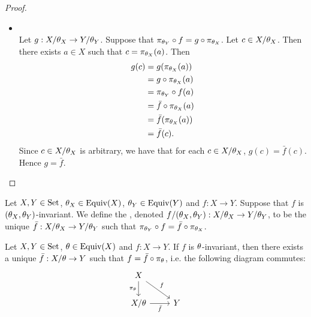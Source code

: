 \begin{proof}
\begin{itemize}
		\item {} \\
		Let $g:X/\theta_X \rightarrow Y/\theta_Y$. Suppose that $\pi_{\theta_Y} \circ f = g \circ \pi_{\theta_X}$. Let $c \in X/\theta_X$. Then there exists $a \in X$ such that $c = \pi_{\theta_X}(a)$. Then 
		\begin{align*}
			g(c)
			& = g(\pi_{\theta_X}(a)) \\
			& = g \circ \pi_{\theta_X}(a) \\
			& = \pi_{\theta_Y} \circ f(a) \\
			& = \bar{f} \circ \pi_{\theta_X}(a) \\
			& = \bar{f}(\pi_{\theta_X}(a)) \\
			& = \bar{f}(c).
		\end{align*}
		Since $c \in X/\theta_X$ is arbitrary, we have that for each $c \in X/\theta_X$, $g(c) = \bar{f}(c)$. Hence $g = \bar{f}$. 
	\end{itemize}
\end{proof}

\begin{defn}
	Let $X, Y \in \text{Set}$, $\theta_X \in \operatorname*{\text{Equiv}}(X)$, $\theta_Y \in \operatorname*{\text{Equiv}}(Y)$ and $f:X \rightarrow Y$. Suppose that $f$ is $(\theta_X, \theta_Y)$-invariant. We define the , denoted $f/(\theta_X, \theta_Y):X/\theta_X \rightarrow Y/\theta_Y$, to be the unique $\bar{f}:X/\theta_X \rightarrow Y/\theta_Y$ such that $\pi_{\theta_Y} \circ f = \bar{f} \circ \pi_{\theta_X}$.
\end{defn}

\begin{ex}
	Let $X, Y \in \text{Set}$, $\theta \in \operatorname*{\text{Equiv}}(X)$ and $f:X \rightarrow Y$. If $f$ is $\theta$-invariant, then there exists a unique $\bar{f}:X/\theta \rightarrow Y$ such that $f = \bar{f} \circ \pi_{\theta}$, i.e. the following diagram commutes: 
	\[ 
	\begin{tikzcd}
		X  \arrow[dr, "f"]  \arrow[d, "\pi_{\th}"']  & \\
		X/ \th \arrow[r, "\bar{f}"'] &  Y  \\
	\end{tikzcd}
	\]
\end{ex}

